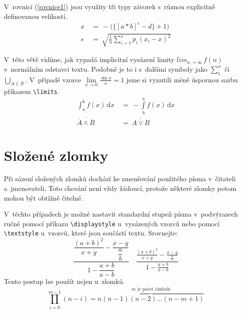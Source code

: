 \documentclass[a4paper, 11pt, twocolumn]{article}[18.03.2012]
\begin{document}
V~rovnici (\ref{rovnice1}) jsou využity tři typy závorek s~různou explicitně
definovanou velikostí.
\begin{align}
x\ &=\ -\bigg(\Big\{[a*b]^c-d\Big\}+1\bigg)\label{rovnice1}\\
s\ &=\ \sqrt{\frac{1}{n}\sum\limits_{i=1}^s p_i (x_i-x)^2}\nonumber
\end{align}

V~této větě vidíme, jak vypadá implicitní vysázení limity $lim_{n\to \infty}\,f(n)$ v~normálním
odstavci textu. Podobně je to i s~dalšími symboly jako $\sum_1^n$ či $\bigcup_{A\in \mathcal{B}}$.
V~případě vzorce $\lim\limits_{x\to 0}\frac{\sin x}{x}=1$ jsme si vynutili méně úspornou sazbu příkazem \verb|\limits|.
\begin{align}
\int_a^b f(x)\,\mathrm{d}x\ &=\ -\int\limits_b^a f(x)\,\mathrm{d}x\\
\overline{\overline{A}\wedge\overline{B}}\ &=\ \overline{\overline{A\vee B}}
\end{align}
\section{Složené zlomky}
Při sázení složených zlomků dochází ke zmenšování použitého písma v~čitateli
a~jmenovateli. Toto chování není vždy žádoucí, protože některé zlomky potom mohou
být obtížně čitelné.

V~těchto případech je možné nastavit standardní stupeň písma v~podvýrazech
ručně pomocí příkazu \verb|\displaystyle| u~vysázených vzorců nebo pomocí \verb|\textstyle|
u~vzorců, které jsou součástí textu. Srovnejte:
\[\dfrac{\dfrac{(a+b)^2}{x+y}-\dfrac{x-y}{\dfrac{a}{b}}}{1-\dfrac{a+b}{a-b}}\quad
\frac{\frac{(a+b)^2}{x+y}-\frac{x-y}{\frac{a}{b}}}{1-\frac{a+b}{a-b}}\]
Tento postup lze použít nejen u~zlomků.
\[\prod_{i=0}^{m-1} (n-i) = \overbrace{n(n-1)(n-2)\dots (n-m+1)}^{\displaystyle{m \text{ je počet činitelů}}}\]
\end{document}
